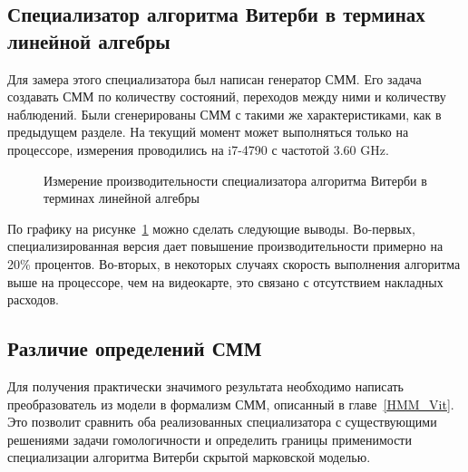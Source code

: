 \subsection{Специализатор алгоритма Витерби в терминах линейной алгебры}
Для замера этого специализатора был написан генератор СММ.
Его задача создавать СММ по количеству состояний, переходов 
между ними и количеству наблюдений.
Были сгенерированы СММ с такими же характеристиками,
как в предыдущем разделе.
На текущий момент  может 
выполняться только на процессоре, измерения проводились на 
 i7-4790 с частотой 3.60 GHz.
\begin{figure}[h]
\centering
\caption{Измерение производительности специализатора алгоритма Витерби в терминах линейной алгебры}	
\label{LA_bench}
\end{figure}

По графику на рисунке~\ref{LA_bench} можно сделать следующие 
выводы.
Во-первых, специализированная версия дает повышение 
производительности примерно на 20\% процентов.
Во-вторых, в некоторых случаях скорость выполнения алгоритма 
выше на процессоре, чем на видеокарте, это связано с 
отсутствием накладных расходов.

\subsection{Различие определений СММ}
Для получения практически значимого результата необходимо 
написать преобразователь из модели  в 
формализм СММ, описанный в главе~\ref{HMM_Vit}.
Это позволит сравнить оба реализованных специализатора с 
существующими решениями задачи гомологичности и определить 
границы применимости специализации алгоритма Витерби скрытой 
марковской моделью.

